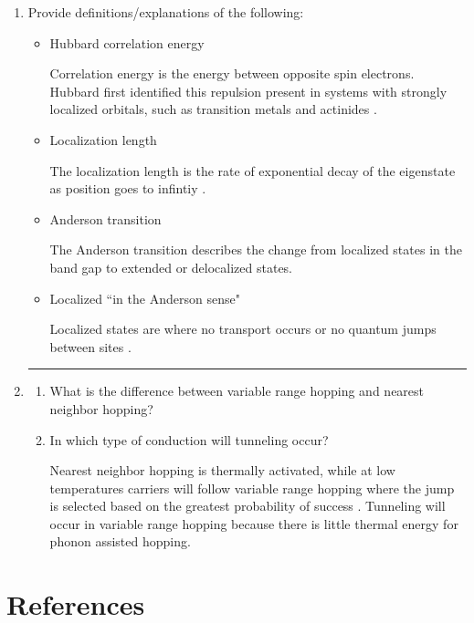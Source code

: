 \documentclass[12pt]{elsarticle}
\newcommand{\vs}{\vspace{2mm}}
\newcommand{\fullline}{\noindent\rule{14cm}{0.4pt} \vspace{4mm}}
\begin{document}
\begin{enumerate}
\fullline
\item Provide definitions/explanations of the following:
\begin{itemize}
	\item Hubbard correlation energy \par \vs
	Correlation energy is the energy between opposite spin electrons. Hubbard first identified this repulsion present in systems with strongly localized orbitals, such as transition metals and actinides \cite{Lee2012}. 
	\item Localization length \par \vs
	The localization length is the rate of exponential decay of the eigenstate as position goes to infintiy \cite{Derevyanko2018}. 
	\item Anderson transition \par \vs
	The Anderson transition describes the change from localized states in the band gap to extended or delocalized states. \cite{Drabold2000}
	\item Localized ``in the Anderson sense" \par \vs 
	Localized states are where no transport occurs or no quantum jumps between sites \cite{Anderson1958}.
\end{itemize}
\fullline
\item \begin{enumerate}
	\item What is the difference between variable range hopping and nearest neighbor hopping?
	\item In which type of conduction will tunneling occur? \par \vs
	
	Nearest neighbor hopping is thermally activated, while at low temperatures carriers will follow variable range hopping where the jump is selected based on the greatest probability of success \cite{Yu2001}. Tunneling will occur in variable range hopping because there is little thermal energy for phonon assisted hopping.
	
	
\end{enumerate}

\end{enumerate}

\section*{References}


\end{document}
